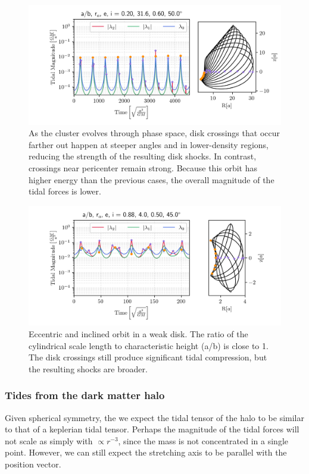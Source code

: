             \begin{figure}
                \centering
                \includegraphics[width=.9\linewidth]{images/miyamoto_disc_shocks_ab_rp_e_i_0.20_31.6_0.60_50.0.png}
                \caption[An eccentric, inclined orbit with a large apocenter]{ As the cluster evolves through phase space, disk crossings that occur farther out happen at steeper angles and in lower-density regions, reducing the strength of the resulting disk shocks. In contrast, crossings near pericenter remain strong. Because this orbit has higher energy than the previous cases, the overall magnitude of the tidal forces is lower. }
                \label{fig:miyamoto_disc_shocks_big_apocenter}
            \end{figure}
            
            \begin{figure}
                \centering
                \includegraphics[width=.9\linewidth]{images/miyamoto_disc_shocks_ab_rp_e_i_0.88_4.0_0.50_45.0.png}
                \caption{Eccentric and inclined orbit in a weak disk. The ratio of the cylindrical scale length  to characteristic height (a/b) is close to 1. The disk crossings still produce significant tidal compression, but the resulting shocks are broader.}
                \label{fig:miyamoto_disc_shocks_weak_shocks}
            \end{figure}

        \subsubsection{Tides from the dark matter halo}
            Given spherical symmetry, the we expect the tidal tensor of the halo to be similar to that of a keplerian tidal tensor. Perhaps the magnitude of the tidal forces will not scale as simply with $\propto r^{-3}$, since the mass is not concentrated in a single point. However, we can still expect the stretching axis to be parallel with the position vector. 
            
